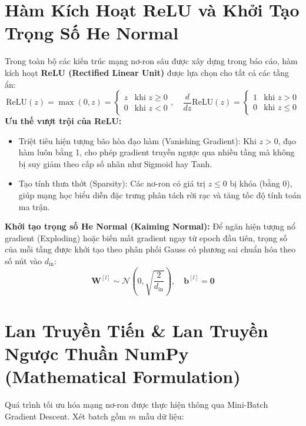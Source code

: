 \documentclass[12pt,a4paper]{report}
\begin{document}
\section{Hàm Kích Hoạt ReLU và Khởi Tạo Trọng Số He Normal}
Trong toàn bộ các kiến trúc mạng nơ-ron sâu được xây dựng trong báo cáo, hàm kích hoạt \textbf{ReLU (Rectified Linear Unit)} được lựa chọn cho tất cả các tầng ẩn:
\begin{equation}
    \text{ReLU}(z) = \max(0, z) = \begin{cases} z & \text{khi } z \ge 0 \\ 0 & \text{khi } z < 0 \end{cases}, \quad \frac{d}{dz}\text{ReLU}(z) = \begin{cases} 1 & \text{khi } z > 0 \\ 0 & \text{khi } z \le 0 \end{cases}
\end{equation}
\textbf{Ưu thế vượt trội của ReLU:}
\begin{itemize}
    \item Triệt tiêu hiện tượng bão hòa đạo hàm (Vanishing Gradient): Khi $z > 0$, đạo hàm luôn bằng 1, cho phép gradient truyền ngược qua nhiều tầng mà không bị suy giảm theo cấp số nhân như Sigmoid hay Tanh.
    \item Tạo tính thưa thớt (Sparsity): Các nơ-ron có giá trị $z \le 0$ bị khóa (bằng 0), giúp mạng học biểu diễn đặc trưng phân tách rời rạc và tăng tốc độ tính toán ma trận.
\end{itemize}

\textbf{Khởi tạo trọng số He Normal (Kaiming Normal):} Để ngăn hiện tượng nổ gradient (Exploding) hoặc biến mất gradient ngay từ epoch đầu tiên, trọng số của mỗi tầng được khởi tạo theo phân phối Gauss có phương sai chuẩn hóa theo số nút vào $d_{\text{in}}$:
\begin{equation}
    \mathbf{W}^{[l]} \sim \mathcal{N}\left(0, \sqrt{\frac{2}{d_{\text{in}}}}\right), \quad \mathbf{b}^{[l]} = \mathbf{0}
\end{equation}

\section{Lan Truyền Tiến \& Lan Truyền Ngược Thuần NumPy (Mathematical Formulation)}
Quá trình tối ưu hóa mạng nơ-ron được thực hiện thông qua Mini-Batch Gradient Descent. Xét batch gồm $m$ mẫu dữ liệu:
\end{document}
